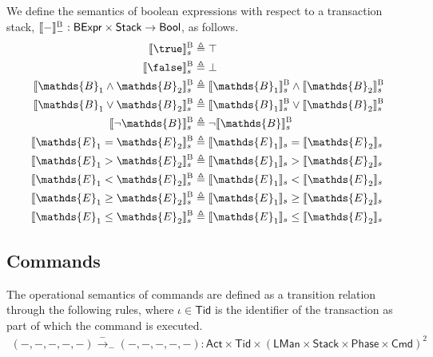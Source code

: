 We define the semantics of boolean expressions with respect to a transaction stack, $\llbracket - \rrbracket_-^\textsc{B} : \mathsf{BExpr} \times \mathsf{Stack} \rightarrow \mathsf{Bool}$, as follows.
\begin{align*}
\llbracket \true \rrbracket_s^\textsc{B} &\triangleq \top \\
\llbracket \false \rrbracket_s^\textsc{B} &\triangleq \bot \\
\llbracket \mathds{B}_1 \land \mathds{B}_2 \rrbracket_s^\textsc{B} &\triangleq \llbracket \mathds{B}_1 \rrbracket_s^\textsc{B} \land \llbracket \mathds{B}_2 \rrbracket_s^\textsc{B} \\
\llbracket \mathds{B}_1 \lor \mathds{B}_2 \rrbracket_s^\textsc{B} &\triangleq \llbracket \mathds{B}_1 \rrbracket_s^\textsc{B} \lor \llbracket \mathds{B}_2 \rrbracket_s^\textsc{B} \\
\llbracket \lnot \mathds{B} \rrbracket_s^\textsc{B} &\triangleq \lnot \llbracket \mathds{B} \rrbracket_s^\textsc{B} \\
\llbracket \mathds{E}_1 = \mathds{E}_2 \rrbracket_s^\textsc{B} &\triangleq \llbracket \mathds{E}_1 \rrbracket_s = \llbracket \mathds{E}_2 \rrbracket_s \\
\llbracket \mathds{E}_1 > \mathds{E}_2 \rrbracket_s^\textsc{B} &\triangleq \llbracket \mathds{E}_1 \rrbracket_s > \llbracket \mathds{E}_2 \rrbracket_s \\
\llbracket \mathds{E}_1 < \mathds{E}_2 \rrbracket_s^\textsc{B} &\triangleq \llbracket \mathds{E}_1 \rrbracket_s < \llbracket \mathds{E}_2 \rrbracket_s \\
\llbracket \mathds{E}_1 \geq \mathds{E}_2 \rrbracket_s^\textsc{B} &\triangleq \llbracket \mathds{E}_1 \rrbracket_s \geq \llbracket \mathds{E}_2 \rrbracket_s \\
\llbracket \mathds{E}_1 \leq \mathds{E}_2 \rrbracket_s^\textsc{B} &\triangleq \llbracket \mathds{E}_1 \rrbracket_s \leq \llbracket \mathds{E}_2 \rrbracket_s \\
\end{align*}

\subsection{Commands}

The operational semantics of commands are defined as a transition relation through the following rules, where $\iota \in \mathsf{Tid}$ is the identifier of the transaction as part of which the command is executed.
\begin{gather*}
(-, -, -, -, -) \xrightarrow{-}_- (-, -, -, -, -) 
: \mathsf{Act} \times \mathsf{Tid} \times (\mathsf{LMan} \times \mathsf{Stack} \times \mathsf{Phase} \times \mathsf{Cmd})^2
\end{gather*}

